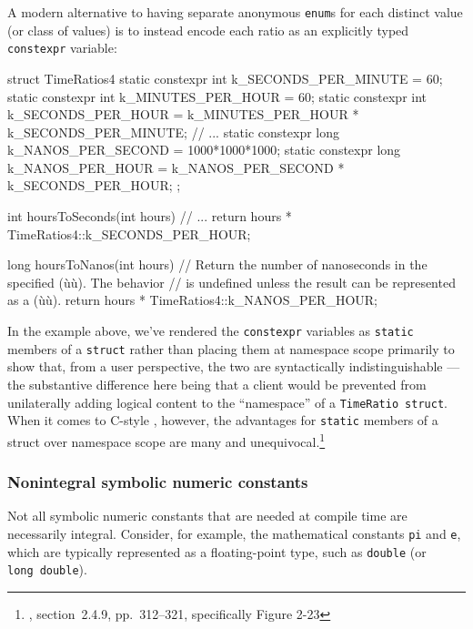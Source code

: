 A modern alternative to having separate anonymous \lstinline!enum!s for
each distinct value (or class of values) is to instead encode each ratio
as an explicitly typed \lstinline!constexpr! variable:

\begin{emcppslisting}
struct TimeRatios4
{
    static constexpr int k_SECONDS_PER_MINUTE = 60;
    static constexpr int k_MINUTES_PER_HOUR   = 60;
    static constexpr int k_SECONDS_PER_HOUR   = k_MINUTES_PER_HOUR *
                                                k_SECONDS_PER_MINUTE;
    // ...
    static constexpr long k_NANOS_PER_SECOND  = 1000*1000*1000;
    static constexpr long k_NANOS_PER_HOUR    = k_NANOS_PER_SECOND *
                                                k_SECONDS_PER_HOUR;
};

int hoursToSeconds(int hours)
    // ...
{
    return hours * TimeRatios4::k_SECONDS_PER_HOUR;
}

long hoursToNanos(int hours)
    // Return the number of nanoseconds in the specified (ù{}ù).  The behavior
    // is undefined unless the result can be represented as a (ù{}ù).
{
    return hours * TimeRatios4::k_NANOS_PER_HOUR;
}
\end{emcppslisting}

\noindent In the example above, we've rendered the \lstinline!constexpr! variables as
\lstinline!static! members of a \lstinline!struct! rather than placing them at
namespace scope primarily to show that, from a user perspective, the two
are syntactically indistinguishable --- the substantive difference here
being that a client would be prevented from unilaterally adding logical
content to the ``namespace'' of a \lstinline!TimeRatio!~\lstinline!struct!.
When it comes to C-style , however, the
advantages for \lstinline!static! members of a struct over namespace scope
are many and \mbox{unequivocal}.{\cprotect\footnote{\cite{lakos20}, section~2.4.9, pp.~312--321, specifically Figure 2-23}}

\subsubsection[Nonintegral symbolic numeric constants]{Nonintegral symbolic numeric constants}\label{non-integral-symbolic-numeric-constants}

Not all symbolic numeric constants that are needed at compile time are
necessarily integral. Consider, for example, the mathematical constants
\lstinline!pi! and \lstinline!e!, which are typically represented as a
floating-point type, such as \lstinline!double! (or
\lstinline!long!~\lstinline!double!).

